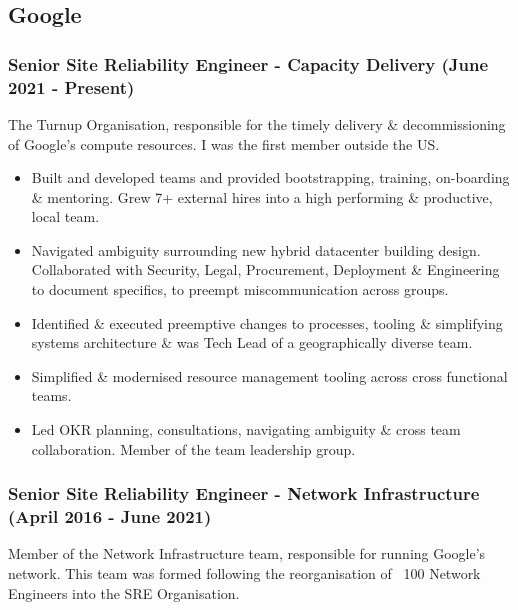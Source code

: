 \documentclass[a4paper, 10pt] {article}
\begin{document}
\subsection*{Google}

\subsubsection*{Senior Site Reliability Engineer - Capacity Delivery (June 2021 - Present)}

The Turnup Organisation, responsible for the timely delivery \&
decommissioning of Google's compute resources. I was the first member
outside the US.

\begin{itemize}[noitemsep]
	\item Built and developed teams and provided bootstrapping, training, 
			  on-boarding \& mentoring. Grew 7+ external hires into a high performing \&
				productive, local team.
  \item Navigated ambiguity surrounding new hybrid datacenter building design.
			  Collaborated with Security, Legal, Procurement, Deployment \& 
			  Engineering to document specifics, to preempt miscommunication across groups.
	\item Identified \& executed preemptive changes to processes, tooling \& simplifying systems
				architecture \& was Tech Lead of a geographically diverse team.
	\item Simplified \& modernised resource management tooling across cross functional teams.
	\item Led OKR planning, consultations, navigating ambiguity \& cross team collaboration. Member
				of the team leadership group.
\end{itemize}

\subsubsection*{Senior Site Reliability Engineer - Network Infrastructure (April 2016 - June 2021)}

Member of the Network Infrastructure team, responsible for running
Google's network. This team was formed following the reorganisation of
~100 Network Engineers into the SRE Organisation.
\end{document}
